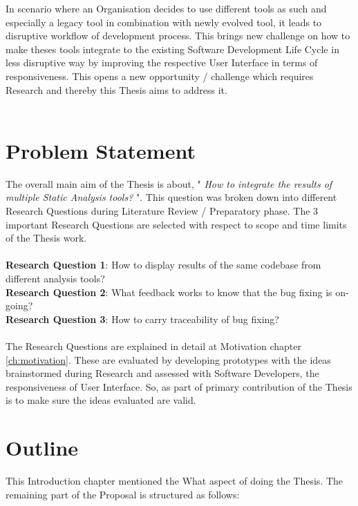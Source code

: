 In scenario where an Organisation decides to use different tools as such and especially a legacy tool in combination with newly evolved tool, it leads to disruptive workflow of development process. This brings new challenge on how to make theses tools integrate to the existing Software Development Life Cycle in less disruptive way by improving the respective User Interface in terms of responsiveness. This opens a new opportunity / challenge which requires Research and thereby this Thesis aims to address it.
\\ \\

\section{Problem Statement}

The overall main aim of the Thesis is about, " \textit{How to integrate the results of multiple Static Analysis tools?} ". This question was broken down into different Research Questions during Literature Review / Preparatory phase. The 3 important Research Questions are selected with respect to scope and time limits of the Thesis work. \\ \\

\noindent\textbf{Research Question 1}: How to display results of the same codebase from different analysis tools? \\
\textbf{Research Question 2}: What feedback works to know that the bug fixing is on-going? \\
\textbf{Research Question 3}: How to carry traceability of bug fixing? \\ \\

The Research Questions are explained in detail at Motivation chapter \ref{ch:motivation}. These are evaluated by developing prototypes with the ideas brainstormed during Research and assessed with Software Developers, the responsiveness of User Interface. So, as part of primary contribution of the Thesis is to make sure the ideas evaluated are valid.

\section{Outline}

This Introduction chapter mentioned the What aspect of doing the Thesis. The remaining part of the Proposal is structured as follows: \\ \\

